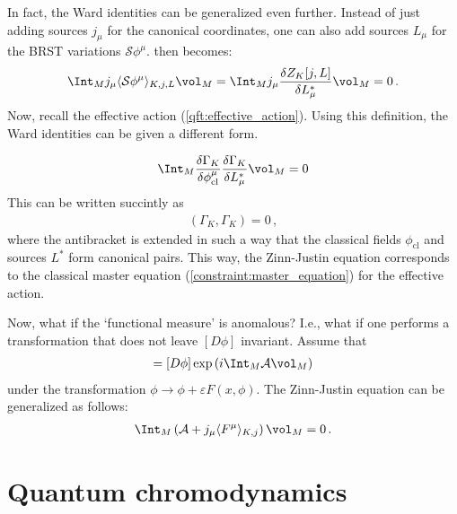    In fact, the Ward identities can be generalized even further. Instead of just adding sources $j_\mu$ for the canonical coordinates, one can also add sources $L_\mu$ for the BRST variations $\mathcal{S}\phi^\mu$.  then becomes:
    \begin{gather}
        \Int_Mj_\mu\langle\mathcal{S}\phi^\mu\rangle_{K,j,L}\vol_M = \Int_Mj_\mu\frac{\delta Z_K[j,L]}{\delta L^*_\mu}\vol_M=0\,.
    \end{gather}
    Now, recall the effective action (\cref{qft:effective_action}). Using this definition, the Ward identities can be given a different form.
    \begin{property}
        \begin{gather}
            \Int_M\frac{\delta\Gamma_K}{\delta\phi^\mu_{\text{cl}}}\frac{\delta\Gamma_K}{\delta L^*_\mu}\vol_M=0
        \end{gather}
        This can be written succintly as
        \begin{gather}
            (\Gamma_K,\Gamma_K)=0\,,
        \end{gather}
        where the antibracket is extended in such a way that the classical fields $\phi_{\text{cl}}$ and sources $L^*$ form canonical pairs. This way, the Zinn-Justin equation corresponds to the classical master equation (\cref{constraint:master_equation}) for the effective action.
    \end{property}

    \begin{property}
        Now, what if the `functional measure' is anomalous? I.e., what if one performs a transformation that does not leave $[D\phi]$ invariant. Assume that
        \begin{gather}
            [D\phi'] = [D\phi]\exp\left(i\Int_M\mathcal{A}\vol_M\right)
        \end{gather}
        under the transformation $\phi\longrightarrow\phi+\varepsilon F(x,\phi)$. The Zinn-Justin equation can be generalized as follows:
        \begin{gather}
            \Int_M\left(\mathcal{A}+j_\mu\langle F^\mu\rangle_{K,j}\right)\vol_M=0\,.
        \end{gather}
    \end{property}

\section{Quantum chromodynamics}\label{section:qcd}

